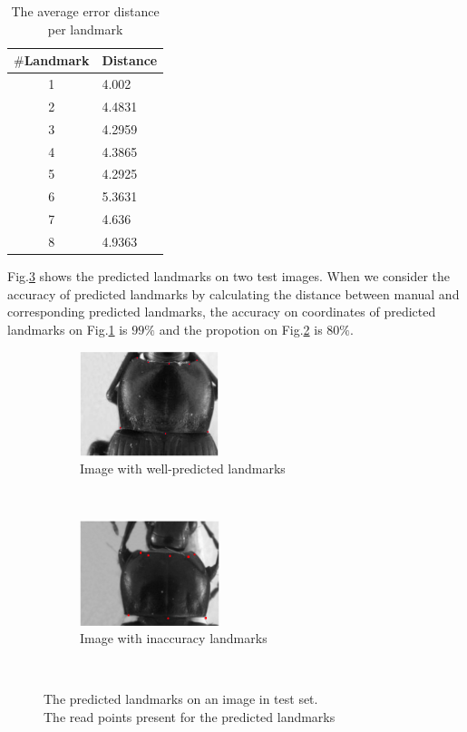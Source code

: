 \documentclass[10pt]{article}
\begin{document}
\begin{table}[htbp]
\centering
\begin{tabular}{|c|p{1.5cm}|}
\hline
\textbf{$\#$Landmark} & \textbf{Distance} \\ \hline
1 & 4.002  \\ \hline
2 & 4.4831 \\ \hline
3 & 4.2959 \\ \hline
4 & 4.3865 \\ \hline
5 & 4.2925 \\ \hline
6 & 5.3631 \\ \hline
7 & 4.636 \\ \hline
8 & 4.9363 \\ \hline
\end{tabular}
\caption{The average error distance per landmark}
\label{tabledistance}
\end{table}
Fig.\ref{figrsexample} shows the predicted landmarks on two test images. When we consider the accuracy of predicted landmarks by calculating the distance between manual and corresponding predicted landmarks, the accuracy on coordinates of predicted landmarks on Fig.\ref{figsub1} is $99\%$ and the propotion on Fig.\ref{figsub2} is $80\%$.

\begin{figure}[htbp]
    \centering
    \begin{subfigure}[t]{0.25\textwidth}
        \centering
        \includegraphics[height=1.2in]{images/plandmark}
        \caption{Image with well-predicted landmarks}
        \label{figsub1}
    \end{subfigure}%
    ~ 
    \begin{subfigure}[t]{0.25\textwidth}
        \centering
        \includegraphics[height=1.2in]{images/plandmark2}
        \caption{Image with inaccuracy landmarks}
        \label{figsub2}
    \end{subfigure}
    \caption{The predicted landmarks on an image in test set.\\
    		 The read points present for the predicted landmarks}\
    \label{figrsexample}
\end{figure}
\end{document}
